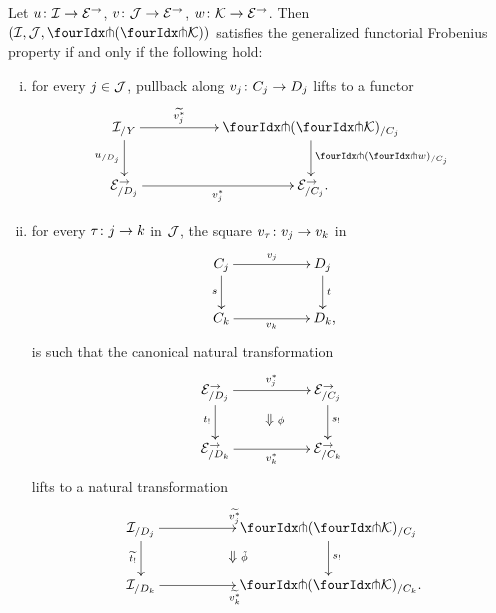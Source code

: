 \documentclass[reqno,10pt,a4paper,oneside,draft]{amsart}
\begin{document}
{{\begin{proposition} \label{def:uniFrobcond}
Let $u \co \cal{I} \to \catE^\to$, $v \co \cal{J} \to \cal{E}^\to$, $w \co \cal{K} \to \catE^\to$.
Then $(\cal{I}, \cal{J}, \liftl{(\liftr{\cal{K}})})$ satisfies the generalized functorial Frobenius property if and only if the following hold:
\begin{enumerate}[(i)]
\item for every $j \in \cal{J}$, pullback along $v_j \co C_j \to D_j$ lifts to a functor
\[
\xymatrix@C+3em{
  \cal{I}_{/Y}
  \ar[r]^-{\widetilde{v_j^*}}
  \ar[d]_-{u_{/D_j}}
&
  \liftl{(\liftr{\cal{K}})}_{/C_j}
  \ar[d]^-{\liftl{(\liftr{w})}_{/C_j}}
\\
  \catE_{/D_j}^\to \ar[r]_-{v_j^*}
&
  \catE_{/C_j}^\to
\rlap{.}}
\]
\item for every $\tau \co j \to k$ in $\cal{J}$, the square $v_\tau \co v_j \to v_k$ in
\begin{equation} \label{def:beck-chevalley:0}
\begin{gathered}
\xymatrix@C+3em{
  C_j
  \ar[r]^{v_j}
  \ar[d]_{s}
&
  D_j
  \ar[d]^{t}
\\
  C_{k}
  \ar[r]_-{v_{k}}
&
  D_{k}
\rlap{,}}
\end{gathered}
\end{equation}
is such that the canonical natural transformation
\[
\xymatrix@C+3em{
  \catE^\to_{/D_j}
  \ar[d]_{t_!}
  \ar[r]^{v_j^*}
  \ar@{}[dr]|{\textstyle\Downarrow \rlap{$\labelstyle\phi$}}
&
  \catE^\to_{/C_j}
  \ar[d]^{s_!}
\\
  \catE^\to_{/D_k}
  \ar[r]_{v_k^*}
&
  \catE^\to_{/C_k}
}
\]
lifts to a natural transformation
\[
\xymatrix@C+3em{
  \cal{I}_{/D_j}
  \ar[r]^{\widetilde{v_j^*}}
  \ar[d]_{\widetilde{t_!}}
  \ar@{}[dr]|{\textstyle\Downarrow \rlap{$\labelstyle\tilde{\phi}$}}
&
  \liftl{(\liftr{\cal{K}})}_{/C_j}
  \ar[d]^{s_!}
\\
  \cal{I}_{/D_k}
  \ar[r]_{\widetilde{v_k^*}}
&
  \liftl{(\liftr{\cal{K}})}_{/C_k}
\rlap{.}}
\]
\end{enumerate}
\end{proposition}

}}
\end{document}
